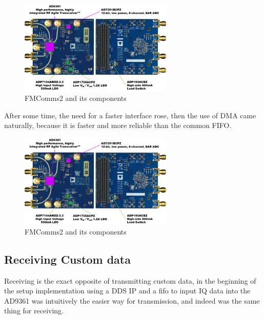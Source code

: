 
\begin{figure}[htbp]
    \centering
    \includegraphics[width=0.65\textwidth]{./figures/fmcomms2_pic}
    \caption{ FMComms2 and its components
    \label{fig:fmcomm}}
\end{figure}

After some time, the need for a faster interface rose, then the use of DMA came
naturally, because it is faster and more reliable than the common FIFO.

\begin{figure}[htbp]
    \centering
    \includegraphics[width=0.65\textwidth]{./figures/fmcomms2_pic}
    \caption{ FMComms2 and its components
    \label{fig:fmcomm}}
\end{figure}

\subsection{Receiving Custom data}

Receiving is the exact opposite of transmitting custom data, in the beginning of
the setup implementation using a DDS IP and a fifo to input IQ data into the
AD9361 was intuitively the easier way for transmission, and indeed was the same
thing for receiving.

